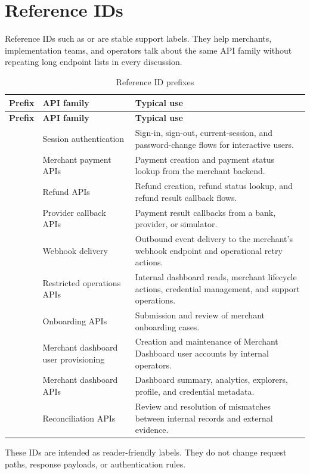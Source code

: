 \section{Reference IDs}

Reference IDs such as  or  are stable support labels.
They help merchants, implementation teams, and operators talk about the same
API family without repeating long endpoint lists in every discussion.

\begin{longtable}{@{}L{0.14\textwidth}L{0.26\textwidth}L{0.52\textwidth}@{}}
\caption{Reference ID prefixes}\\
\toprule
\textbf{Prefix} & \textbf{API family} & \textbf{Typical use} \\
\midrule
\endfirsthead
\toprule
\textbf{Prefix} & \textbf{API family} & \textbf{Typical use} \\
\midrule
\endhead
{} & Session authentication & Sign-in, sign-out, current-session,
and password-change flows for interactive users. \\
\bodyrowrule
{} & Merchant payment APIs & Payment creation and payment status
lookup from the merchant backend. \\
\bodyrowrule
{} & Refund APIs & Refund creation, refund status lookup, and refund
result callback flows. \\
\bodyrowrule
{} & Provider callback APIs & Payment result callbacks from a bank,
provider, or simulator. \\
\bodyrowrule
{} & Webhook delivery & Outbound event delivery to the merchant's
webhook endpoint and operational retry actions. \\
\bodyrowrule
{} & Restricted operations APIs & Internal dashboard reads, merchant
lifecycle actions, credential management, and support operations. \\
\bodyrowrule
{} & Onboarding APIs & Submission and review of merchant onboarding
cases. \\
\bodyrowrule
{} & Merchant dashboard user provisioning & Creation and maintenance
of Merchant Dashboard user accounts by internal operators. \\
\bodyrowrule
{} & Merchant dashboard APIs & Dashboard summary, analytics,
explorers, profile, and credential metadata. \\
\bodyrowrule
{} & Reconciliation APIs & Review and resolution of mismatches
between internal records and external evidence. \\
\bottomrule
\end{longtable}

These IDs are intended as reader-friendly labels. They do not change request
paths, response payloads, or authentication rules.
